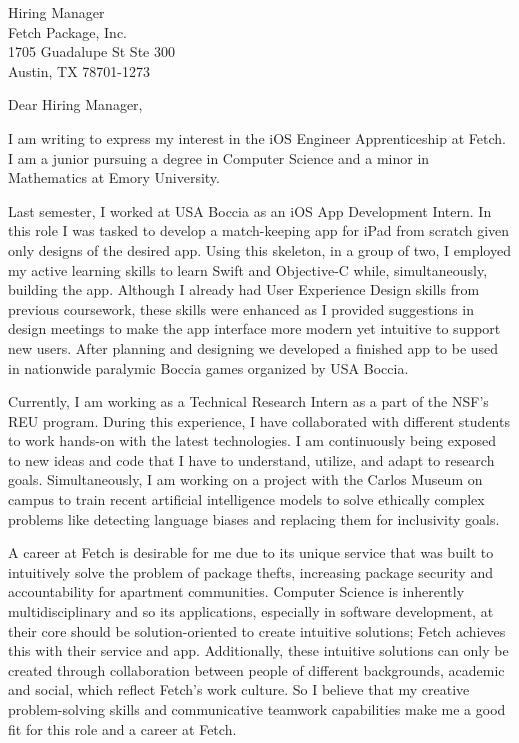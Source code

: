 \documentclass[letterpaper,12pt]{letter}
\date{}
\begin{document}
\begin{letter}{%
    Hiring Manager \\ 
	Fetch Package, Inc. \\
	1705 Guadalupe St Ste 300 \\
    Austin, TX 78701-1273
}

\opening{Dear Hiring Manager,}

I am writing to express my interest in the iOS Engineer Apprenticeship at Fetch. I am a junior pursuing 
a degree in Computer Science and a minor in Mathematics at Emory University.

Last semester, I worked at USA Boccia as an iOS App Development Intern. In this role I was tasked to 
develop a match-keeping app for iPad from scratch given only designs of the desired app. Using this skeleton, 
in a group of two, I employed my active learning skills to learn Swift and Objective-C while, simultaneously,
building the app. Although I already had User Experience Design skills from previous coursework, these skills
were enhanced as I provided suggestions in design meetings to make the app interface more modern
yet intuitive to support new users. After planning and designing we developed a finished app 
to be used in nationwide paralymic Boccia games organized by USA Boccia.

Currently, I am working as a Technical Research Intern as a part of the NSF's 
REU program. During this experience, I have  
collaborated with different students to work hands-on with the latest technologies.
I am continuously being exposed to new ideas 
and code that I have to understand, utilize, and adapt to research goals. Simultaneously, I am working on a project with the Carlos Museum on campus to train recent 
artificial intelligence models to solve ethically complex problems like detecting language biases and 
replacing them for inclusivity goals.

A career at Fetch is desirable for me due to its unique service that was built to intuitively solve the problem
of package thefts, increasing package security and accountability for apartment communities. Computer Science
is inherently multidisciplinary and so its applications, especially in software development, at their core should 
be solution-oriented to create intuitive solutions; Fetch achieves this with their service and app. Additionally,
these intuitive solutions can only be created through collaboration between people of different backgrounds, 
academic and social, which reflect Fetch's work culture. So I believe that my creative problem-solving skills 
and communicative teamwork capabilities make me a good fit for this role and a career at Fetch.


\end{letter}
\end{document}

